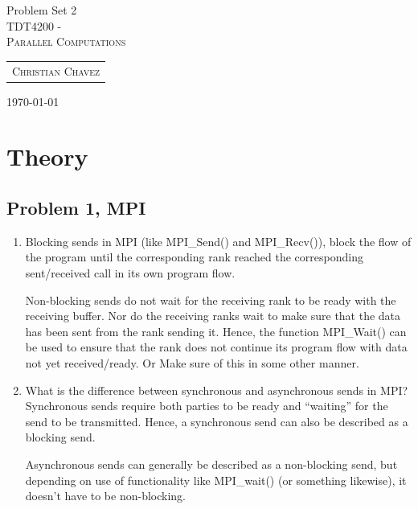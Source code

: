 \documentclass[fontsize=11pt, paper=a4, titlepage]{article}
\begin{document}
\begin{center}

{\huge Problem Set 2}\\[0.5cm]

\textsc{\LARGE TDT4200 -}\\[0.5cm]
\textsc{\large Parallel Computations}\\[1.0cm]

\begin{table}[h]
    \centering
    \begin{tabular}{c}
        \textsc{Christian Chavez}
    \end{tabular}
\end{table}

\end{center}
\vfill
\large{\today}
\clearpage

\section{Theory}
\subsection{Problem 1, MPI}

\begin{enumerate}
\renewcommand{\theenumi}{\alph{enumi})}

    \item Blocking sends in MPI (like MPI\_Send() and MPI\_Recv()), block the
flow of the program until the corresponding rank reached the corresponding
sent/received call in its own program flow.

Non-blocking sends do not wait for the receiving rank to be ready with the
receiving buffer. Nor do the receiving ranks wait to make sure that the data has
been sent from the rank sending it. Hence, the function MPI\_Wait() can be used
to ensure that the rank does not continue its program flow with data not yet
received/ready. Or Make sure of this in some other manner.

    \item What is the difference between synchronous and asynchronous sends in MPI?
Synchronous sends require both parties to be ready and ``waiting'' for the send to be transmitted. Hence, a synchronous send can also be described as a blocking send.

Asynchronous sends can generally be described as a non-blocking send, but
depending on use of functionality like MPI\_wait() (or something likewise), it
doesn't have to be non-blocking.

\end{enumerate}
\end{document}

